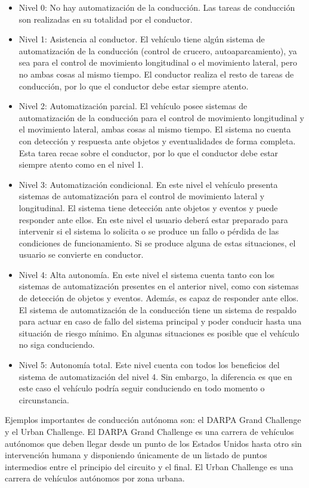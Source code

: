 \begin{itemize}
\item Nivel 0: No hay automatización de la conducción. Las tareas de conducción son realizadas en su totalidad por el conductor.
\item	Nivel 1: Asistencia al conductor. El vehículo tiene algún sistema de automatización de la conducción (control de crucero, autoaparcamiento), ya sea para el control de movimiento longitudinal o el movimiento lateral, pero no ambas cosas al mismo tiempo. El conductor realiza el resto de tareas de conducción, por lo que el conductor debe estar siempre atento.
\item	Nivel 2: Automatización parcial. El vehículo posee sistemas de automatización de la conducción para el control de movimiento longitudinal y el movimiento lateral, ambas cosas al mismo tiempo. El sistema no cuenta con detección y respuesta ante objetos y eventualidades de forma completa. Esta tarea recae sobre el conductor, por lo que el conductor debe estar siempre atento como en el nivel 1.
\item	Nivel 3: Automatización condicional. En este nivel el vehículo presenta sistemas de automatización para el control de movimiento lateral y longitudinal. El sistema tiene detección ante objetos y eventos y puede responder ante ellos. En este nivel el usuario deberá estar preparado para intervenir si el sistema lo solicita o se produce un fallo o pérdida de las condiciones de funcionamiento. Si se produce alguna de estas situaciones, el usuario se convierte en conductor.
\item Nivel 4: Alta autonomía. En este nivel el sistema cuenta tanto con los sistemas de automatización presentes en el anterior nivel, como con sistemas de detección de objetos y eventos. Además, es capaz de responder ante ellos. El sistema de automatización de la conducción tiene un sistema de respaldo para actuar en caso de fallo del sistema principal y poder conducir hasta una situación de riesgo mínimo. En algunas situaciones es posible que el vehículo no siga conduciendo.
\item	Nivel 5: Autonomía total. Este nivel cuenta con todos los beneficios del sistema de automatización del nivel 4. Sin embargo, la diferencia es que en este caso el vehículo podría seguir conduciendo en todo momento o circunstancia.

\end{itemize}

Ejemplos importantes de conducción autónoma son: el DARPA Grand Challenge y el Urban Challenge. El DARPA Grand Challenge es una carrera de vehículos autónomos que deben llegar desde un punto de los Estados Unidos hasta otro sin intervención humana y disponiendo únicamente de un listado de puntos intermedios entre el principio del circuito y el final. El Urban Challenge es una carrera de vehículos autónomos por zona urbana.

